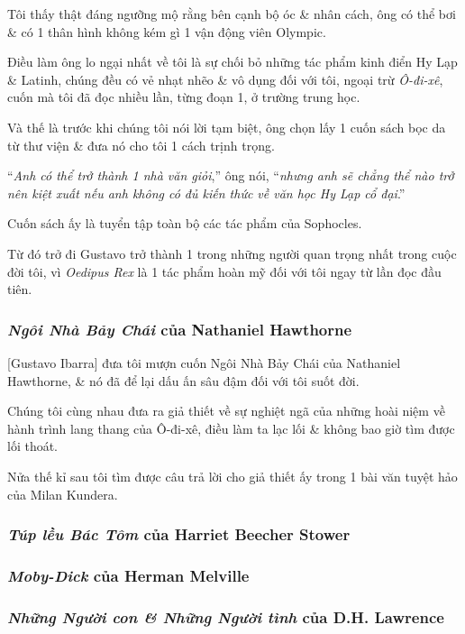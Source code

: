 \documentclass{article}
\begin{document}
Tôi thấy thật đáng ngưỡng mộ rằng bên cạnh bộ óc \& nhân cách, ông có thể bơi \& có 1 thân hình không kém gì 1 vận động viên Olympic.

Điều làm ông lo ngại nhất về tôi là sự chối bỏ những tác phẩm kinh điển Hy Lạp \& Latinh, chúng đều có vẻ nhạt nhẽo \& vô dụng đối với tôi, ngoại trừ \textit{Ô-đi-xê}, cuốn mà tôi đã đọc nhiều lần, từng đoạn 1, ở trường trung học.

Và thế là trước khi chúng tôi nói lời tạm biệt, ông chọn lấy 1 cuốn sách bọc da từ thư viện \& đưa nó cho tôi 1 cách trịnh trọng.

``\textit{Anh có thể trở thành 1 nhà văn giỏi},'' ông nói, ``\textit{nhưng anh sẽ chẳng thể nào trở nên kiệt xuất nếu anh không có đủ kiến thức về văn học Hy Lạp cổ đại}.''

Cuốn sách ấy là tuyển tập toàn bộ các tác phẩm của Sophocles.

Từ đó trở đi Gustavo trở thành 1 trong những người quan trọng nhất trong cuộc đời tôi, vì \textit{Oedipus Rex} là 1 tác phẩm hoàn mỹ đối với tôi ngay từ lần đọc đầu tiên.

\subsubsection{\textit{Ngôi Nhà Bảy Chái} của Nathaniel Hawthorne}
[Gustavo Ibarra] đưa tôi mượn cuốn Ngôi Nhà Bảy Chái của Nathaniel Hawthorne, \& nó đã để lại dấu ấn sâu đậm đối với tôi suốt đời.

Chúng tôi cùng nhau đưa ra giả thiết về sự nghiệt ngã của những hoài niệm về hành trình lang thang của Ô-đi-xê, điều làm ta lạc lối \& không bao giờ tìm được lối thoát.

Nửa thế kỉ sau tôi tìm được câu trả lời cho giả thiết ấy trong 1 bài văn tuyệt hảo của Milan Kundera.

\subsubsection{\textit{Túp lều Bác Tôm} của Harriet Beecher Stower}

\subsubsection{\textit{Moby-Dick} của Herman Melville}

\subsubsection{\textit{Những Người con \& Những Người tình} của D.H. Lawrence}
\end{document}
